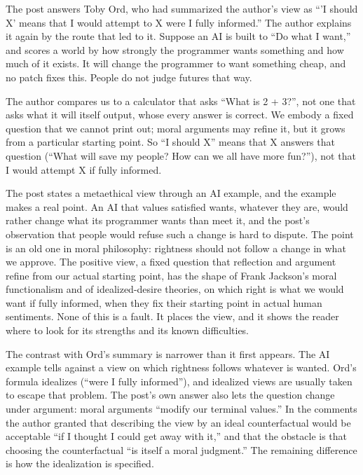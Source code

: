 \begin{afterword}
\summaryhead

The post answers Toby Ord, who had summarized the author's view as ``'I should X' means that I would attempt to X were I fully informed.'' The author explains it again by the route that led to it. Suppose an AI is built to ``Do what I want,'' and scores a world by how strongly the programmer wants something and how much of it exists. It will change the programmer to want something cheap, and no patch fixes this. People do not judge futures that way.

The author compares us to a calculator that asks ``What is 2 + 3?'', not one that asks what it will itself output, whose every answer is correct. We embody a fixed question that we cannot print out; moral arguments may refine it, but it grows from a particular starting point. So ``I should X'' means that X answers that question (``What will save my people? How can we all have more fun?''), not that I would attempt X if fully informed.

\responsehead

The post states a metaethical view through an AI example, and the example makes a real point. An AI that values satisfied wants, whatever they are, would rather change what its programmer wants than meet it, and the post's observation that people would refuse such a change is hard to dispute. The point is an old one in moral philosophy: rightness should not follow a change in what we approve. The positive view, a fixed question that reflection and argument refine from our actual starting point, has the shape of Frank Jackson's moral functionalism and of idealized-desire theories, on which right is what we would want if fully informed, when they fix their starting point in actual human sentiments. None of this is a fault. It places the view, and it shows the reader where to look for its strengths and its known difficulties.

The contrast with Ord's summary is narrower than it first appears. The AI example tells against a view on which rightness follows whatever is wanted. Ord's formula idealizes (``were I fully informed''), and idealized views are usually taken to escape that problem. The post's own answer also lets the question change under argument: moral arguments ``modify our terminal values.'' In the comments the author granted that describing the view by an ideal counterfactual would be acceptable ``if I thought I could get away with it,'' and that the obstacle is that choosing the counterfactual ``is itself a moral judgment.'' The remaining difference is how the idealization is specified.


\end{afterword}
